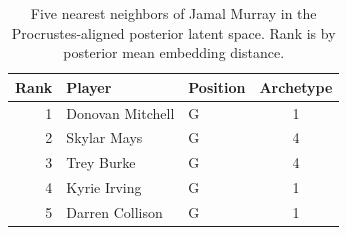 \begin{table}[htbp]
  \centering\small
  \begin{tabular}{rllc}
    \toprule
    Rank & Player & Position & Archetype \\
    \midrule
    1 & Donovan Mitchell & G & 1 \\
    2 & Skylar Mays & G & 4 \\
    3 & Trey Burke & G & 4 \\
    4 & Kyrie Irving & G & 1 \\
    5 & Darren Collison & G & 1 \\
    \bottomrule
  \end{tabular}
  \caption{Five nearest neighbors of Jamal Murray in the Procrustes-aligned posterior latent space. Rank is by posterior mean embedding distance.}
  \label{tab:Jamal_Murray_neighbors}
\end{table}

